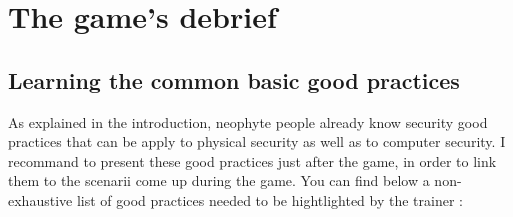 \documentclass[11pt]{article} %
\begin{document}

\section{The game's debrief}
\subsection{Learning the common basic good practices}
As explained in the introduction, neophyte people already know  security 
good practices that can be apply to physical security as well as to computer 
security. I recommand to present these good practices just after the game, in 
order to link them to the scenarii come up during the game. You can find below 
a non-exhaustive list of good practices needed to be hightlighted by the trainer : 
\end{document}
